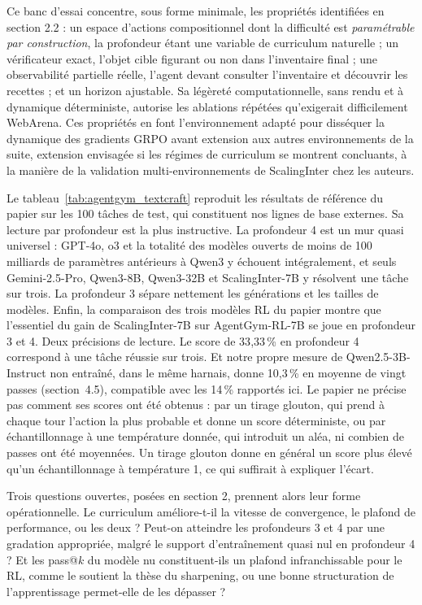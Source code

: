 \documentclass[11pt,a4paper]{article}
\begin{document}
Ce banc d'essai concentre, sous forme minimale, les propriétés identifiées en section 2.2 : un espace d'actions compositionnel dont la difficulté est \emph{paramétrable par construction}, la profondeur étant une variable de curriculum naturelle ; un vérificateur exact, l'objet cible figurant ou non dans l'inventaire final ; une observabilité partielle réelle, l'agent devant consulter l'inventaire et découvrir les recettes ; et un horizon ajustable. Sa légèreté computationnelle, sans rendu et à dynamique déterministe, autorise les ablations répétées qu'exigerait difficilement WebArena. Ces propriétés en font l'environnement adapté pour disséquer la dynamique des gradients GRPO avant extension aux autres environnements de la suite, extension envisagée si les régimes de curriculum se montrent concluants, à la manière de la validation multi-environnements de ScalingInter chez les auteurs.

Le tableau~\ref{tab:agentgym_textcraft} reproduit les résultats de référence du papier sur les 100 tâches de test, qui constituent nos lignes de base externes. Sa lecture par profondeur est la plus instructive. La profondeur 4 est un mur quasi universel : GPT-4o, o3 et la totalité des modèles ouverts de moins de 100 milliards de paramètres antérieurs à Qwen3 y échouent intégralement, et seuls Gemini-2.5-Pro, Qwen3-8B, Qwen3-32B et ScalingInter-7B y résolvent une tâche sur trois. La profondeur 3 sépare nettement les générations et les tailles de modèles. Enfin, la comparaison des trois modèles RL du papier montre que l'essentiel du gain de ScalingInter-7B sur AgentGym-RL-7B se joue en profondeur 3 et 4. Deux précisions de lecture. Le score de 33{,}33\,\% en profondeur 4 correspond à une tâche réussie sur trois. Et notre propre mesure de Qwen2.5-3B-Instruct non entraîné, dans le même harnais, donne 10{,}3\,\% en moyenne de vingt passes (section~4.5), compatible avec les 14\,\% rapportés ici. Le papier ne précise pas comment ses scores ont été obtenus : par un tirage glouton, qui prend à chaque tour l'action la plus probable et donne un score déterministe, ou par échantillonnage à une température donnée, qui introduit un aléa, ni combien de passes ont été moyennées. Un tirage glouton donne en général un score plus élevé qu'un échantillonnage à température 1, ce qui suffirait à expliquer l'écart.



Trois questions ouvertes, posées en section 2, prennent alors leur forme opérationnelle. Le curriculum améliore-t-il la vitesse de convergence, le plafond de performance, ou les deux ? Peut-on atteindre les profondeurs 3 et 4 par une gradation appropriée, malgré le support d'entraînement quasi nul en profondeur 4 ? Et les pass@$k$ du modèle nu constituent-ils un plafond infranchissable pour le RL, comme le soutient la thèse du sharpening, ou une bonne structuration de l'apprentissage permet-elle de les dépasser ?
\end{document}
